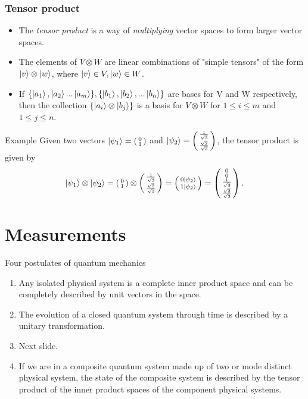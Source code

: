 \documentclass[handout, 10 pt]{beamer}
\newcommand{\icol}[1]{%
  \left(\begin{smallmatrix}#1\end{smallmatrix}\right)%
}
\begin{document}
\begin{frame}
\frametitle{Tensor product}
\begin{itemize}
    \item The \textit{tensor product} is a way of {\emph{multiplying}} vector spaces to form larger vector spaces. 
    \pause
    \item The elements of $V \otimes W$ are linear combinations of "simple tensors" of the form $\ket{v} \otimes \ket{w}$, where $\ket{v} \in V, \ket{w} \in W$. 
    \pause
    \item If $\{\ket{a_1}, \ket{a_2}...\ket{a_m}\}, \{\ket{b_1},\ket{b_2}, ...\ket{b_n}\}$ are bases for V and W respectively, then the collection $\{\ket{a_i}\otimes\ket{b_j}\}$ is a basis for $V \otimes W$ for $1\leq i \leq m$ and $1 \leq j \leq n$.
\end{itemize}
\pause
\begin{block}{Example}
Given two vectors $\ket{\psi_1}=\icol{0\\1}$ and $\ket{\psi_2}=\icol{\frac{1}{\sqrt{3}}\\\frac{\sqrt{2}}{\sqrt{3}}}$, the tensor product is given by
\begin{equation}
\ket{\psi_1} \otimes\ket{\psi_2}
= \icol{0\\1} \otimes \icol{\frac{1}{\sqrt{3}}\\\frac{\sqrt{2}}{\sqrt{3}}} = \icol{ 0\ket{\psi_2} \\ 1\ket{\psi_2}}=\icol{0\\0\\\frac{1}{\sqrt{3}}\\\frac{\sqrt{2}}{\sqrt{3}}}.
\end{equation}
\end{block}
\end{frame}

\section{Measurements}
\begin{comment}
Note the following description is not mathematically rigorous.
\end{comment}

\begin{frame}{Four postulates of quantum mechanics}
    \begin{enumerate}
        \item Any isolated physical system is a complete inner product space and can be completely described by unit vectors in the space.
        \pause
        \item The evolution of a closed quantum system through time is described by a unitary transformation.
        \pause
        \item Next slide.
        \pause
        \item If we are in a composite quantum system made up of two or mode distinct physical system, the state of the composite system is described by the tensor product of the inner product spaces of the component physical systems. 
    \end{enumerate}
\end{frame}
\end{document}
